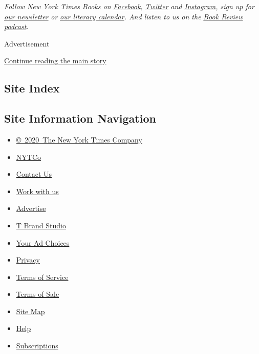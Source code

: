 \emph{Follow New York Times Books on}
\href{https://www.facebookcorewwwi.onion/nytbooks/}{\emph{Facebook}}\emph{,}
\href{https://twitter.com/nytimesbooks}{\emph{Twitter}} \emph{and}
\href{https://www.instagram.com/nytbooks/}{\emph{Instagram}}\emph{, sign
up for}
\href{https://www.nytimes3xbfgragh.onion/newsletters/books-review}{\emph{our
newsletter}} \emph{or}
\href{https://www.nytimes3xbfgragh.onion/interactive/2017/books/books-calendar.html}{\emph{our
literary calendar}}\emph{. And listen to us on the}
\href{https://www.nytimes3xbfgragh.onion/column/book-review-podcast}{\emph{Book
Review podcast}}\emph{.}

Advertisement

\protect\hyperlink{after-bottom}{Continue reading the main story}

\hypertarget{site-index}{%
\subsection{Site Index}\label{site-index}}

\hypertarget{site-information-navigation}{%
\subsection{Site Information
Navigation}\label{site-information-navigation}}

\begin{itemize}
\tightlist
\item
  \href{https://help.nytimes3xbfgragh.onion/hc/en-us/articles/115014792127-Copyright-notice}{©~2020~The
  New York Times Company}
\end{itemize}

\begin{itemize}
\tightlist
\item
  \href{https://www.nytco.com/}{NYTCo}
\item
  \href{https://help.nytimes3xbfgragh.onion/hc/en-us/articles/115015385887-Contact-Us}{Contact
  Us}
\item
  \href{https://www.nytco.com/careers/}{Work with us}
\item
  \href{https://nytmediakit.com/}{Advertise}
\item
  \href{http://www.tbrandstudio.com/}{T Brand Studio}
\item
  \href{https://www.nytimes3xbfgragh.onion/privacy/cookie-policy\#how-do-i-manage-trackers}{Your
  Ad Choices}
\item
  \href{https://www.nytimes3xbfgragh.onion/privacy}{Privacy}
\item
  \href{https://help.nytimes3xbfgragh.onion/hc/en-us/articles/115014893428-Terms-of-service}{Terms
  of Service}
\item
  \href{https://help.nytimes3xbfgragh.onion/hc/en-us/articles/115014893968-Terms-of-sale}{Terms
  of Sale}
\item
  \href{https://spiderbites.nytimes3xbfgragh.onion}{Site Map}
\item
  \href{https://help.nytimes3xbfgragh.onion/hc/en-us}{Help}
\item
  \href{https://www.nytimes3xbfgragh.onion/subscription?campaignId=37WXW}{Subscriptions}
\end{itemize}
